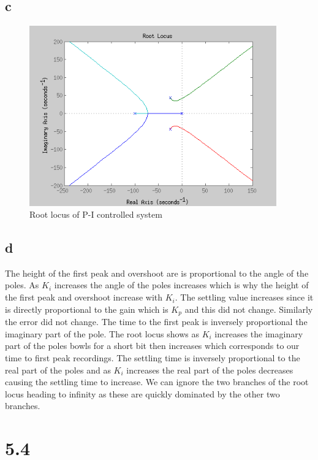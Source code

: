 \documentclass{article}
\begin{document}
\subsection*{c} %
\begin{figure}[!htbp]
    \centering
    \includegraphics[width=0.95\textwidth]{5_3_locus.png}
    \caption{Root locus of P-I controlled system}
\end{figure}

\subsection*{d} %
The height of the first peak and overshoot are is proportional to the angle of the poles. As $K_i$ increases the angle of the poles increases which is why the height of the first peak and overshoot increase with $K_i$. The settling value increases since it is directly proportional to the gain which is $K_p$ and this did not change. Similarly the error did not change. The time to the first peak is inversely proportional the imaginary part of the pole. The root locus shows as $K_i$ increases the imaginary part of the poles bowls for a short bit then increases which corresponds to our time to first peak recordings. The settling time is inversely proportional to the real part of the poles and as $K_i$ increases the real part of the poles decreases causing the settling time to increase. We can ignore the two branches of the root locus heading to infinity as these are quickly dominated by the other two branches.

\newpage
\section*{5.4} %
\end{document}
